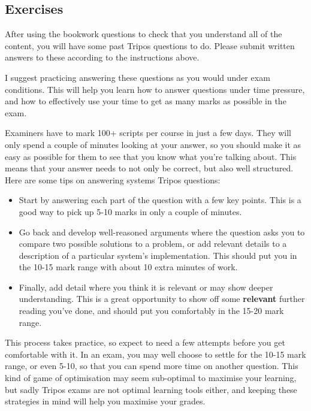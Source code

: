 \documentclass[12pt,a4paper,oneside,openright]{report}
\begin{document}
  
\subsection*{Exercises}

After using the bookwork questions to check that you understand all of
the content, you will have some past Tripos questions to do. Please
submit written answers to these according to the instructions above.

I suggest practicing answering these questions as you would under exam
conditions. This will help you learn how to answer questions under
time pressure, and how to effectively use your time to get as many
marks as possible in the exam.

Examiners have to mark 100+ scripts per course in just a few
days. They will only spend a couple of minutes looking at your answer,
so you should make it as easy as possible for them to see that you
know what you're talking about. This means that your answer needs to
not only be correct, but also well structured. Here are some tips on
answering systems Tripos questions:

\begin{itemize}
\item Start by answering each part of the question with a few key
  points. This is a good way to pick up 5-10 marks in only a couple of
  minutes.
\item Go back and develop well-reasoned arguments where the question
  asks you to compare two possible solutions to a problem, or add
  relevant details to a description of a particular system's
  implementation. This should put you in the 10-15 mark range with
  about 10 extra minutes of work.
\item Finally, add detail where you think it is relevant or may show
  deeper understanding. This is a great opportunity to show off some
  \textbf{relevant} further reading you've done, and should put you
  comfortably in the 15-20 mark range.
\end{itemize}

This process takes practice, so expect to need a few attempts before
you get comfortable with it. In an exam, you may well choose to settle
for the 10-15 mark range, or even 5-10, so that you can spend more
time on another question. This kind of game of optimisation may seem
sub-optimal to maximise your learning, but sadly Tripos exams are not
optimal learning tools either, and keeping these strategies in mind
will help you maximise your grades.
  
\end{document}
